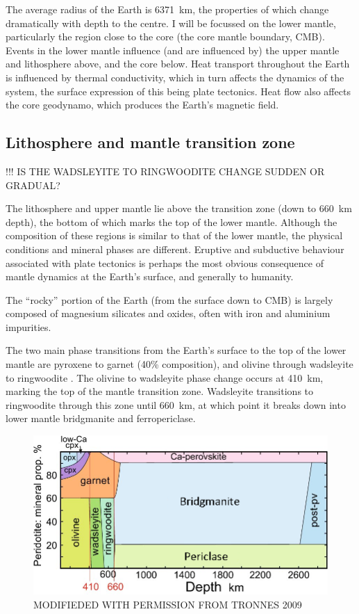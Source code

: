 The average radius of the Earth is 6371~km, the properties of which change dramatically with depth to the centre. I will be focussed on the lower mantle, particularly the region close to the core (the core mantle boundary, CMB). Events in the lower mantle influence (and are influenced by) the upper mantle and lithosphere above, and the core below. Heat transport throughout the Earth is influenced by thermal conductivity, which in turn affects the dynamics of the system, the surface expression of this being plate tectonics. Heat flow also affects the core geodynamo, which produces the Earth's magnetic field. 

\subsection{Lithosphere and mantle transition zone}

!!! IS THE WADSLEYITE TO RINGWOODITE CHANGE SUDDEN OR GRADUAL?

The lithosphere and upper mantle lie above the transition zone (down to 660~km depth), the bottom of which marks the top of the lower mantle. Although the composition of these regions is similar to that of the lower mantle, the physical conditions and mineral phases are different. Eruptive and subductive behaviour associated with plate tectonics is perhaps the most obvious consequence of mantle dynamics at the Earth's surface, and generally to humanity.

The ``rocky'' portion of the Earth (from the surface down to CMB) is largely 
composed of magnesium silicates and oxides, often with iron and aluminium impurities. 

The two main phase transitions from the Earth's surface to the top of the lower mantle are pyroxene to garnet (40\% composition), and olivine through wadsleyite to ringwoodite \citep[60\%, see Figure~\ref{fig:tronnes_perid_comp}][]{Tronnes2009}. The olivine to wadsleyite phase change occurs at 410~km, marking the top of the mantle transition zone. Wadsleyite transitions to ringwoodite through this zone until 660~km, at which point it breaks down into lower mantle bridgmanite and ferropericlase.

\begin{figure}[h!]
  \includegraphics[width=\linewidth]{Figures/tronnes_perid_compo.png}
  \caption[TRONNES PERIDOTITE COMPOSITION DIAGRAM]{MODIFIEDED WITH PERMISSION FROM TRONNES 2009}
  \label{fig:tronnes_perid_comp}
\end{figure}
